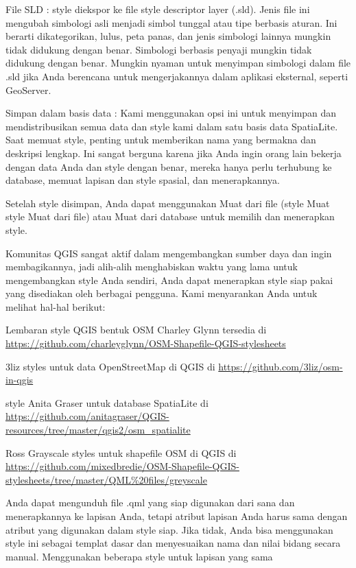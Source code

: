 \documentclass[]{book}
\begin{document}
File SLD : style diekspor ke file style descriptor layer (.sld). Jenis file ini mengubah simbologi asli menjadi simbol tunggal atau tipe berbasis aturan. Ini berarti dikategorikan, lulus, peta panas, dan jenis simbologi lainnya mungkin tidak didukung dengan benar. Simbologi berbasis penyaji mungkin tidak didukung dengan benar. Mungkin nyaman untuk menyimpan simbologi dalam file .sld jika Anda berencana untuk mengerjakannya dalam aplikasi eksternal, seperti GeoServer.

Simpan dalam basis data : Kami menggunakan opsi ini untuk menyimpan dan mendistribusikan semua data dan style kami dalam satu basis data SpatiaLite. Saat memuat style, penting untuk memberikan nama yang bermakna dan deskripsi lengkap. Ini sangat berguna karena jika Anda ingin orang lain bekerja dengan data Anda dan style dengan benar, mereka hanya perlu terhubung ke database, memuat lapisan dan style spasial, dan menerapkannya.

Setelah style disimpan, Anda dapat menggunakan Muat dari file (style \textbar{} Muat style \textbar{} Muat dari file) atau Muat dari database untuk memilih dan menerapkan style.

Komunitas QGIS sangat aktif dalam mengembangkan sumber daya dan ingin membagikannya, jadi alih-alih menghabiskan waktu yang lama untuk mengembangkan style Anda sendiri, Anda dapat menerapkan style siap pakai yang disediakan oleh berbagai pengguna. Kami menyarankan Anda untuk melihat hal-hal berikut:

Lembaran style QGIS bentuk OSM Charley Glynn tersedia di \url{https://github.com/charleyglynn/OSM-Shapefile-QGIS-stylesheets}

3liz styles untuk data OpenStreetMap di QGIS di \url{https://github.com/3liz/osm-in-qgis}

style Anita Graser untuk database SpatiaLite di \url{https://github.com/anitagraser/QGIS-resources/tree/master/qgis2/osm_spatialite}

Ross Grayscale styles untuk shapefile OSM di QGIS di \url{https://github.com/mixedbredie/OSM-Shapefile-QGIS-stylesheets/tree/master/QML\%20files/greyscale}

Anda dapat mengunduh file .qml yang siap digunakan dari sana dan menerapkannya ke lapisan Anda, tetapi atribut lapisan Anda harus sama dengan atribut yang digunakan dalam style siap. Jika tidak, Anda bisa menggunakan style ini sebagai templat dasar dan menyesuaikan nama dan nilai bidang secara manual.
Menggunakan beberapa style untuk lapisan yang sama
\end{document}
